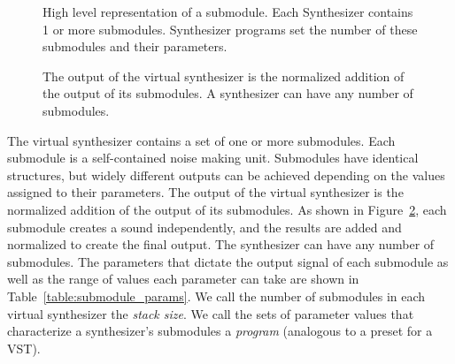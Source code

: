 \documentclass[\main/thesis.tex]{subfiles}
\begin{document}
 \begin{figure}[htbp]
    \begin{center}
    \end{center}
    \caption{High level representation of a submodule. Each Synthesizer contains 1 or more submodules. Synthesizer programs set the number of these submodules and their parameters.
    }
\label{fig:submodule}
\end{figure}

 \begin{figure}[htbp]
    \begin{center}
    \end{center}
    \caption{The output of the virtual synthesizer is the normalized addition of the output of its submodules. A synthesizer can have any number of submodules. 
    }
\label{fig:synth_modules}
\end{figure}
 The virtual synthesizer contains a set of one or more submodules. Each submodule is a self-contained noise making unit. Submodules have identical structures, but widely different outputs can be achieved depending on the values assigned to their parameters. The output of the virtual synthesizer is the normalized addition of the output of its submodules. As shown in Figure~\ref{fig:synth_modules}, each submodule creates a sound independently, and the results are added and normalized to create the final output. The synthesizer can have any number of submodules. The parameters that dictate the output signal of each submodule as well as the range of values each parameter can take are shown in Table~\ref{table:submodule_params}. We call the number of submodules in each virtual synthesizer the \textit{stack size}. We call the sets of parameter values that characterize a synthesizer's submodules a \textit{program} (analogous to a preset for a VST).  
\end{document}
